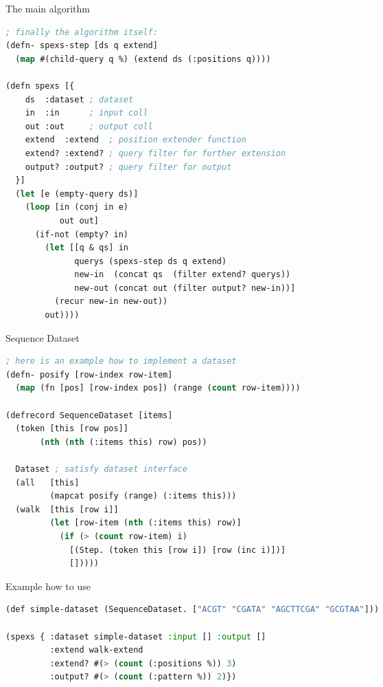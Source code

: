 \begin{algorithm}[H]
    \caption{The main algorithm}
\begin{lstlisting}[language=Lisp]
; finally the algorithm itself:
(defn- spexs-step [ds q extend]
  (map #(child-query q %) (extend ds (:positions q))))

(defn spexs [{
    ds  :dataset ; dataset
    in  :in      ; input coll
    out :out     ; output coll
    extend  :extend  ; position extender function
    extend? :extend? ; query filter for further extension
    output? :output? ; query filter for output
  }]
  (let [e (empty-query ds)]
    (loop [in (conj in e)
           out out]
      (if-not (empty? in)
        (let [[q & qs] in
              querys (spexs-step ds q extend)
              new-in  (concat qs  (filter extend? querys))
              new-out (concat out (filter output? new-in))]
          (recur new-in new-out))
        out))))
\end{lstlisting}
\end{algorithm}

\begin{algorithm}[H]
    \caption{Sequence Dataset}
\begin{lstlisting}[language=Lisp]
; here is an example how to implement a dataset
(defn- posify [row-index row-item]
  (map (fn [pos] [row-index pos]) (range (count row-item))))

(defrecord SequenceDataset [items]
  (token [this [row pos]] 
       (nth (nth (:items this) row) pos))
  
  Dataset ; satisfy dataset interface
  (all   [this]
         (mapcat posify (range) (:items this)))
  (walk  [this [row i]] 
         (let [row-item (nth (:items this) row)]
           (if (> (count row-item) i)
             [(Step. (token this [row i]) [row (inc i)])]
             []))))
\end{lstlisting}
\end{algorithm}

\begin{algorithm}[H]
    \caption{Example how to use}
\begin{lstlisting}[language=Lisp]
(def simple-dataset (SequenceDataset. ["ACGT" "CGATA" "AGCTTCGA" "GCGTAA"]))

(spexs { :dataset simple-dataset :input [] :output []
         :extend walk-extend
         :extend? #(> (count (:positions %)) 3)
         :output? #(> (count (:pattern %)) 2)})
\end{lstlisting}
\end{algorithm}
